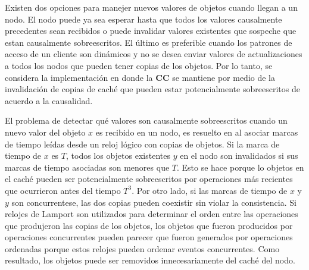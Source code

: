 \documentclass[12pt, times]{simauth}
\begin{document}
Existen dos opciones para manejer nuevos valores de objetos cuando llegan a un nodo. El nodo puede ya sea esperar hasta que todos los valores causalmente precedentes sean recibidos o puede invalidar valores existentes que sospeche que estan causalmente sobreescritos. El último es preferible cuando los patrones de acceso de un cliente son dinámicos y no se desea enviar valores de actualizaciones a todos los nodos que pueden tener copias de los objetos. Por lo tanto, se considera la implementación en donde la \textbf{CC} se mantiene por medio de la invalidación de copias de caché que pueden estar potencialmente sobreescritos de acuerdo a la causalidad.

El problema de detectar qué valores son causalmente sobreescritos cuando un nuevo valor del objeto $x$ es recibido en un nodo, es resuelto en \cite{john} al asociar marcas de tiempo leídas desde un reloj lógico con copias de objetos. Si la marca de tiempo de $x$ es $T$, todos los objetos existentes $y$ en el nodo son invalidados si sus marcas de tiempo asociadas son menores que $T$. Esto se hace porque lo objetos en el caché pueden ser potencialmente sobreescritos por operaciones más recientes que ocurrieron antes del tiempo $T^3$. Por otro lado, si las marcas de tiempo de $x$ y $y$ son concurrentese, las dos copias pueden coexistir sin violar la consistencia. Si relojes de Lamport son utilizados para determinar el orden entre las operaciones que produjeron las copias de los objetos, los objetos que fueron producidos por operaciones concurrentes pueden parecer que fueron generados por operaciones ordenadas porque estos relojes pueden ordenar eventos concurrentes. Como resultado, los objetos puede ser removidos innecesariamente del caché del nodo.
\end{document}
